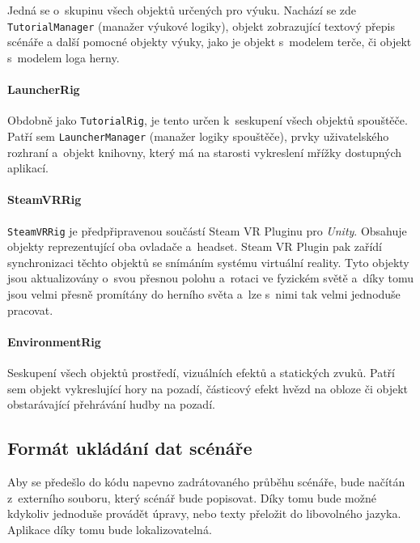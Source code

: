 Jedná se o~skupinu všech objektů určených pro výuku. Nachází se zde
\texttt{TutorialManager} (manažer výukové logiky), objekt zobrazující textový přepis scénáře a
další pomocné objekty výuky, jako je objekt s~modelem terče, či objekt
s~modelem loga herny.

\paragraph{LauncherRig}\label{launcherrig}

Obdobně jako \texttt{TutorialRig}, je tento určen k~seskupení všech
objektů spouštěče. Patří sem \texttt{LauncherManager} (manažer logiky spouštěče), prvky
uživatelského rozhraní a~objekt knihovny, který má na starosti
vykreslení mřížky dostupných aplikací.

\paragraph{SteamVRRig}\label{steamvrrig}

\texttt{SteamVRRig} je předpřipravenou součástí Steam VR Pluginu pro
\emph{Unity}. Obsahuje objekty reprezentující oba ovladače a~headset.
Steam VR Plugin pak zařídí synchronizaci těchto objektů se snímáním
systému virtuální reality. Tyto objekty jsou aktualizovány o~svou
přesnou polohu a~rotaci ve fyzickém světě a~díky tomu jsou velmi přesně
promítány do herního světa a~lze s~nimi tak velmi jednoduše pracovat.

\paragraph{EnvironmentRig}\label{environmentrig}

Seskupení všech objektů prostředí, vizuálních efektů a
statických zvuků. Patří sem objekt vykreslující hory na pozadí,
částicový efekt hvězd na obloze či objekt obstarávající přehrávání hudby
na pozadí.

\subsection{Formát ukládání dat
scénáře}\label{formuxe1t-ukluxe1duxe1nuxed-dat-scuxe9nuxe1ux159e}

Aby se předešlo do kódu napevno zadrátovaného průběhu scénáře, bude
načítán z~externího souboru, který scénář bude popisovat. Díky tomu bude
možné kdykoliv jednoduše provádět úpravy, nebo texty přeložit do
libovolného jazyka. Aplikace díky tomu bude lokalizovatelná.


